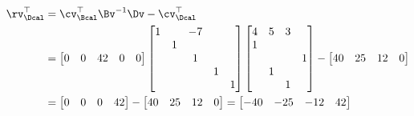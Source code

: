 \documentclass{ctexart}
\begin{document}
\begin{example} [用修正单纯形法求分数背包问题]
\begin{align*}
        \rv_\Dcal^\top & = \cv_\Bcal^\top \Bv^{-1} \Dv - \cv_\Dcal^\top \\
                       & =
        \begin{bmatrix}
            0 & 0 & 42 & 0 & 0
        \end{bmatrix}
        \begin{bmatrix}
            1 &   & -7         \\
              & 1              \\
              &   & 1          \\
              &   &    & 1     \\
              &   &    &   & 1
        \end{bmatrix}
        \begin{bmatrix}
            4 & 5 & 3     \\
            1             \\
              &   &   & 1 \\
              & 1         \\
              &   & 1     \\
        \end{bmatrix} -
        \begin{bmatrix}
            40 & 25 & 12 & 0
        \end{bmatrix}                                                \\
                       & =
        \begin{bmatrix}
            0 & 0 & 0 & 42
        \end{bmatrix} -
        \begin{bmatrix}
            40 & 25 & 12 & 0
        \end{bmatrix} =
        \begin{bmatrix}
            -40 & -25 & -12 & 42
        \end{bmatrix}
    \end{align*}


\end{example}
\end{document}
